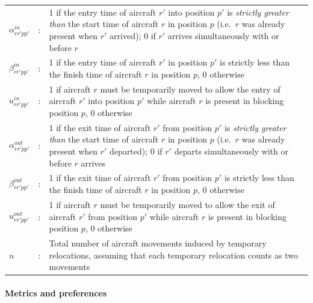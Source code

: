 \begin{longtable}{>{\hspace{0pt}}l c p{11.2cm}}
    $\alpha^{in}_{rr'pp'}$ & : & 1 if the entry time of aircraft $r'$ into position $p'$ is \emph{strictly greater than} the start time of aircraft $r$ in position $p$ (i.e.\ $r$ was already present when $r'$ arrived); 0 if $r'$ arrives simultaneously with or before $r$ \\
    $\beta^{in}_{rr'pp'}$ & : & 1 if the entry time of aircraft $r'$ in position $p'$ is strictly less than the finish time of aircraft $r$ in position $p$, 0 otherwise \\
    $u^{in}_{rr'pp'}$ & : & 1 if aircraft $r$ must be temporarily moved to allow the entry of aircraft $r'$ into position $p'$ while aircraft $r$ is present in blocking position $p$, 0 otherwise \\
    $\alpha^{out}_{rr'pp'}$ & : & 1 if the exit time of aircraft $r'$ from position $p'$ is \emph{strictly greater than} the start time of aircraft $r$ in position $p$ (i.e.\ $r$ was already present when $r'$ departed); 0 if $r'$ departs simultaneously with or before $r$ arrives \\
    $\beta^{out}_{rr'pp'}$ & : & 1 if the exit time of aircraft $r'$ from position $p'$ is strictly less than the finish time of aircraft $r$ in position $p$, 0 otherwise \\
    $u^{out}_{rr'pp'}$ & : & 1 if aircraft $r$ must be temporarily moved to allow the exit of aircraft $r'$ from position $p'$ while aircraft $r$ is present in blocking position $p$, 0 otherwise \\
    $n$ & : & Total number of aircraft movements induced by temporary relocations, assuming that each temporary relocation counts as two movements \\
\end{longtable}

\paragraph{Metrics and preferences}

